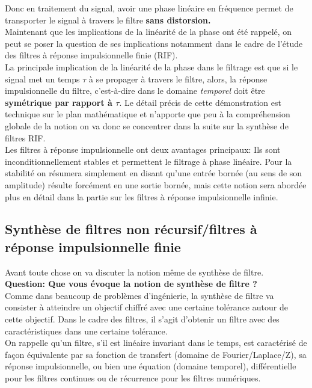 \documentclass[11pt,a4paper]{article}
\begin{document}
Donc en traitement du signal, avoir une phase linéaire en fréquence permet de transporter le signal à travers le filtre \textbf{sans distorsion.}\\

Maintenant que les implications de la linéarité de la phase ont été rappelé, on peut se poser la question de ses implications notamment dans le cadre de l'étude des filtres à réponse impulsionnelle finie (RIF).\\

La principale implication de la linéarité de la phase dans le filtrage est que si le signal met un temps $\tau$ à se propager à travers le filtre, alors, la réponse impulsionnelle du filtre, c'est-à-dire dans le domaine \textit{temporel} doit être \textbf{symétrique par rapport à $\tau$}. Le détail précis de cette démonstration est technique sur le plan mathématique et n'apporte que peu à la compréhension globale de la notion on va donc se concentrer dans la suite sur la synthèse de filtres RIF.\\ 

Les filtres à réponse impulsionnelle ont deux avantages principaux: Ils sont inconditionnellement stables et permettent le filtrage à phase linéaire. Pour la stabilité on résumera simplement en disant qu'une entrée bornée (au sens de son amplitude) résulte forcément en une sortie bornée, mais cette notion sera abordée plus en détail dans la partie sur les filtres à réponse impulsionnelle infinie.\\

\subsection{Synthèse de filtres non récursif/filtres à réponse impulsionnelle finie} 
Avant toute chose on va discuter la notion même de synthèse de filtre.\\

\textbf{Question: Que vous évoque la notion de synthèse de filtre ?}\\

Comme dans beaucoup de problèmes d'ingénierie, la synthèse de filtre va consister à atteindre un objectif chiffré avec une certaine tolérance autour de cette objectif. Dans le cadre des filtres, il s'agit d'obtenir un filtre avec des caractéristiques dans une certaine tolérance.\\

On rappelle qu'un filtre, s'il est linéaire invariant dans le temps, est caractérisé de façon équivalente par sa fonction de transfert (domaine de Fourier/Laplace/Z), sa réponse impulsionnelle, ou bien une équation (domaine temporel), différentielle pour les filtres continues ou de récurrence pour les filtres numériques.\\
\end{document}
